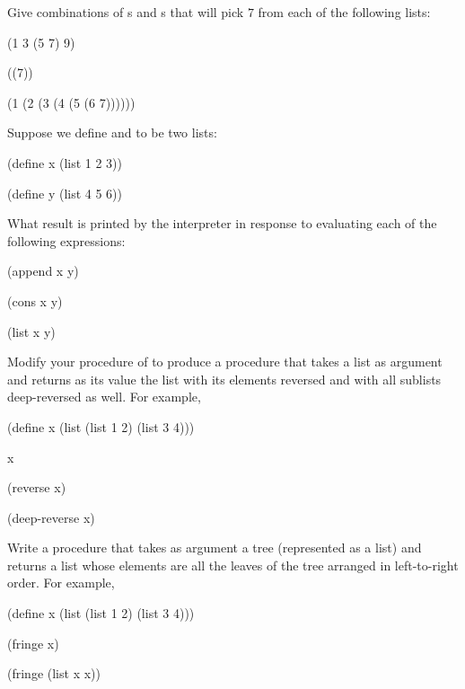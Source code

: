 \begin{exercise}
	\label{Exercise 2.25}
	Give combinations of s and s that will pick \( 7 \) from each of the following lists:
	\begin{scheme}
	  (1 3 (5 7) 9)

	  ((7))

	  (1 (2 (3 (4 (5 (6 7))))))
	\end{scheme}
\end{exercise}



\begin{exercise}
	\label{Exercise 2.26}
	Suppose we define  and  to be two lists:
	\begin{scheme}
	  (define x (list 1 2 3))

	  (define y (list 4 5 6))
	\end{scheme}
	What result is printed by the interpreter in response to evaluating each of the
	following expressions:
	\begin{scheme}
	  (append x y)

	  (cons x y)

	  (list x y)
	\end{scheme}
\end{exercise}



\begin{exercise}
	\label{Exercise 2.27}
	Modify your  procedure of  to produce a  procedure that takes a list as argument and returns as its value the list with its elements reversed and with all sublists deep-reversed as well.
	For example,
	\begin{scheme}
	  (define x (list (list 1 2) (list 3 4)))

	  x
	  ~~

	  (reverse x)
	  ~~

	  (deep-reverse x)
	  ~~
	\end{scheme}
\end{exercise}



\begin{exercise}
	\label{Exercise 2.28}
	Write a procedure  that takes as argument a tree (represented as a list) and returns a list whose elements are all the leaves of the tree arranged in left-to-right order.
	For example,
	\begin{scheme}
	  (define x (list (list 1 2) (list 3 4)))

	  (fringe x)
	  ~\outprint{(1 2 3 4)}~

	  (fringe (list x x))
	  ~\outprint{(1 2 3 4 1 2 3 4)}~
	\end{scheme}
\end{exercise}



